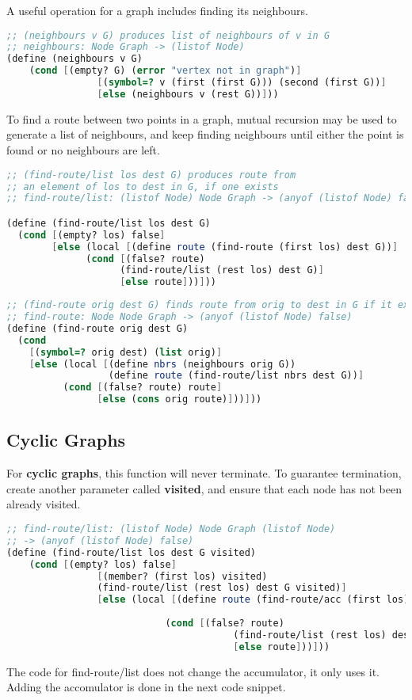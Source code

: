 \documentclass[english, 12pt]{article}
\begin{document}
\begin{exmp}
A useful operation for a graph includes finding its neighbours.
\begin{lstlisting}[language=Scheme]
;; (neighbours v G) produces list of neighbours of v in G
;; neighbours: Node Graph -> (listof Node)
(define (neighbours v G)
	(cond [(empty? G) (error "vertex not in graph")]
				[(symbol=? v (first (first G))) (second (first G))]
				[else (neighbours v (rest G))]))
\end{lstlisting}
\end{exmp}
\begin{exmp}
To find a route between two points in a graph, mutual recursion may be used to generate a list of neighbours, and keep finding neighbours until either the point is found or no neighbours are left.
\begin{lstlisting}[language=Scheme]
;; (find-route/list los dest G) produces route from
;; an element of los to dest in G, if one exists
;; find-route/list: (listof Node) Node Graph -> (anyof (listof Node) false)

(define (find-route/list los dest G)
  (cond [(empty? los) false]
        [else (local [(define route (find-route (first los) dest G))]
              (cond [(false? route)
                    (find-route/list (rest los) dest G)]
                    [else route]))]))
\end{lstlisting}
\begin{lstlisting}[language=Scheme]
;; (find-route orig dest G) finds route from orig to dest in G if it exists
;; find-route: Node Node Graph -> (anyof (listof Node) false)
(define (find-route orig dest G)
  (cond 
    [(symbol=? orig dest) (list orig)]
    [else (local [(define nbrs (neighbours orig G))
                  (define route (find-route/list nbrs dest G))]
          (cond [(false? route) route]
                [else (cons orig route)]))]))
\end{lstlisting}
\end{exmp}
\subsection{Cyclic Graphs}
\begin{note}
For \textbf{cyclic graphs}, this function will never terminate. To guarantee termination, create another parameter called \textbf{visited}, and ensure that each node has not been already visited.
\end{note}
\pagebreak
\begin{lstlisting}[language=Scheme]
;; find-route/list: (listof Node) Node Graph (listof Node)
;; -> (anyof (listof Node) false)
(define (find-route/list los dest G visited)
	(cond [(empty? los) false]
				[(member? (first los) visited)
				(find-route/list (rest los) dest G visited)]
				[else (local [(define route (find-route/acc (first los)
																			dest G visited))]
							(cond [(false? route)
										(find-route/list (rest los) dest G visited)]
										[else route]))]))
\end{lstlisting}
The code for find-route/list does not change the accumulator, it only uses it. Adding the accomulator is done in the next code snippet. 
\end{document}
